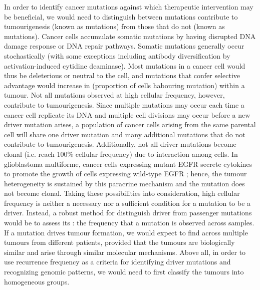 In order to identify cancer mutations against which therapeutic intervention may be beneficial, we would need to distinguish between mutations contribute to tumourigenesis (known as  mutations) from those that do not (known as  mutations). Cancer cells accumulate somatic mutations by having disrupted DNA damage response or DNA repair pathways. Somatic mutations generally occur stochastically (with some exceptions including antibody diversification by activation-induced cytidine deaminase). Most mutations in a cancer cell would thus be deleterious or neutral to the cell, and mutations that confer selective advantage would increase in  (proportion of cells habouring mutation) within a tumour. Not all mutations observed at high cellular frequency, however, contribute to tumourigenesis. Since multiple mutations may occur each time a cancer cell replicate its DNA and multiple cell divisions may occur before a new driver mutation arises, a population of cancer cells arising from the same parental cell will share one driver mutation and many additional mutations that do not contribute to tumourigenesis. Additionally, not all driver mutations become clonal (i.e. reach 100\% cellular frequency) due to interaction among cells. In glioblastoma multiforme, cancer cells expressing mutant EGFR secrete cytokines to promote the growth of cells expressing wild-type EGFR ; hence, the tumour heterogeneity is sustained by this paracrine mechanism and the  mutation does not become clonal. Taking these possibilities into consideration, high cellular frequency is neither a necessary nor a sufficient condition for a mutation to be a driver. Instead, a robust method for distinguish driver from passenger mutations would be to assess its : the frequency that a mutation is observed across samples. If a mutation drives tumour formation, we would expect to find across multiple tumours from different patients, provided that the tumours are biologically similar and arise through similar molecular mechanisms. Above all, in order to use recurrence frequency as a criteria for identifying driver mutations and recognizing genomic patterns, we would need to first classify the tumours into homogeneous groups.

